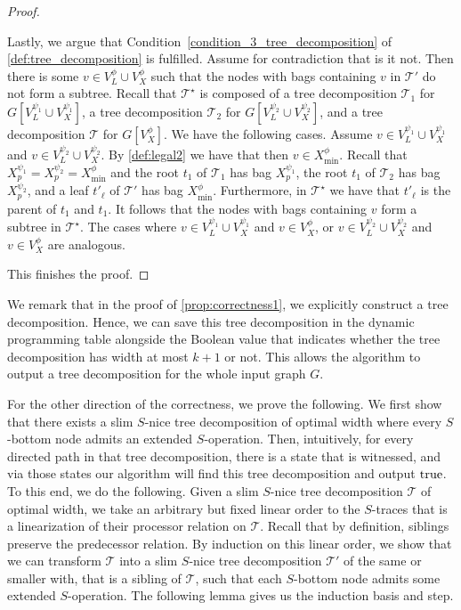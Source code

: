 \documentclass[a4paper,UKenglish,cleveref, autoref, thm-restate, numberwithinsect]{lipics-v2021}
\newcounter{algorithm}
\newcommand{\true}{\textup{true}}
\begin{document}
\begin{proof}
\begin{enumerate}
Lastly, we argue that Condition~\ref{condition_3_tree_decomposition} of \cref{def:tree_decomposition} is fulfilled. Assume for contradiction that is it not. 
Then there is some $v\in V^\phi_L\cup V^\phi_X$ such that
the nodes with bags containing $v$ in $\mathcal{T}'$ do not form a subtree. Recall that $\mathcal{T}^\star$ is composed of a tree decomposition $\mathcal{T}_1$ for $G[V^{\psi_1}_L\cup V^{\psi_1}_X]$, a tree decomposition $\mathcal{T}_2$ for $G[V^{\psi_2}_L\cup V^{\psi_2}_X]$, and a tree decomposition $\mathcal{T}$ for $G[V^\phi_X]$. 
We have the following cases.
Assume $v\in V^{\psi_1}_L\cup V^{\psi_1}_X$ and $v\in V^{\psi_2}_L\cup V^{\psi_2}_X$. By \cref{def:legal2} we have that then $v\in X^\phi_{\min}$.
Recall that 
$X^{\psi_1}_p=X^{\psi_2}_p=X^\phi_{\min}$ and the root $t_1$ of $\mathcal{T}_1$ has bag $X^{\psi_1}_p$, the root $t_1$ of $\mathcal{T}_2$ has bag $X^{\psi_2}_p$, and a leaf $t'_\ell$ of $\mathcal{T}'$ has bag $X^\phi_{\min}$. Furthermore, in $\mathcal{T}^\star$ we have that $t'_\ell$ is the parent of $t_1$ and $t_1$. It follows that the nodes with bags containing $v$ form a subtree in $\mathcal{T}^\star$.
The cases where $v\in V^{\psi_1}_L\cup V^{\psi_1}_X$ and $v\in V^\phi_X$, or $v\in V^{\psi_2}_L\cup V^{\psi_2}_X$ and $v\in V^\phi_X$ are analogous.
\end{enumerate}
This finishes the proof.
\end{proof}

We remark that in the proof of \cref{prop:correctness1}, we explicitly construct a tree decomposition. Hence, we can save this tree decomposition in the dynamic programming table alongside the Boolean value that indicates whether the tree decomposition has width at most $k+1$ or not. This allows the algorithm to output a tree decomposition for the whole input graph $G$.


For the other direction of the correctness, we prove the following. We first show that there exists a slim $S$-nice tree decomposition of optimal width where every $S$-bottom node admits an extended $S$-operation. Then, intuitively, for every directed path in that tree decomposition, there is a state that is witnessed, and via those states our algorithm will find this tree decomposition and output $\true$. 
To this end, we do the following. Given a slim $S$-nice tree decomposition $\mathcal{T}$ of optimal width, we take an arbitrary but fixed linear order to the $S$-traces that is a linearization of their processor relation on $\mathcal{T}$. Recall that by definition, siblings preserve the predecessor relation.
By induction on this linear order, we show that we can transform $\mathcal{T}$ into a slim $S$-nice tree decomposition $\mathcal{T}'$ of the same or smaller with, that is a sibling of $\mathcal{T}$, such that each $S$-bottom node admits some extended $S$-operation.
The following lemma gives us the induction basis and step.
\end{document}

